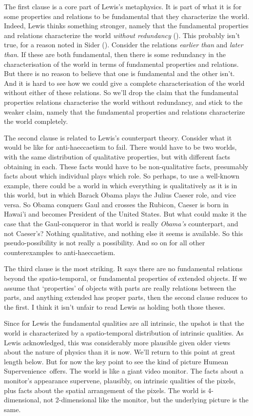 \documentclass[
  11pt,
  letterpaper,
  DIV=11,
  numbers=noendperiod,
  twoside]{scrartcl}
\begin{document}
The first clause is a core part of Lewis's metaphysics. It is part of
what it is for some properties and relations to be fundamental that they
characterize the world. Indeed, Lewis thinks something stronger, namely
that the fundamental properties and relations characterize the world
\emph{without redundancy} ().
This probably isn't true, for a reason noted in Sider
(). Consider the relations \emph{earlier
than} and \emph{later than}. If these are both fundamental, then there
is some redundancy in the characterisation of the world in terms of
fundamental properties and relations. But there is no reason to believe
that one is fundamental and the other isn't. And it is hard to see how
we could give a complete characterisation of the world without either of
these relations. So we'll drop the claim that the fundamental properties
relations characterise the world without redundancy, and stick to the
weaker claim, namely that the fundamental properties and relations
characterize the world completely.

The second clause is related to Lewis's counterpart theory. Consider
what it would be like for anti-haeccaetism to fail. There would have to
be two worlds, with the same distribution of qualitative properties, but
with different facts obtaining in each. These facts would have to be
non-qualitative facts, presumably facts about which individual plays
which role. So perhaps, to use a well-known example, there could be a
world in which everything is qualitatively as it is in this world, but
in which Barack Obama plays the Julius Caeser role, and vice versa. So
Obama conquers Gaul and crosses the Rubicon, Caeser is born in Hawai'i
and becomes President of the United States. But what could make it the
case that the Gaul-conqueror in that world is really \emph{Obama's}
counterpart, and not Caeser's? Nothing qualitative, and nothing else it
seems is available. So this pseudo-possibility is not really a
possibility. And so on for all other counterexamples to
anti-haeccaetism.

The third clause is the most striking. It says there are no fundamental
relations beyond the spatio-temporal, or fundamental properties of
extended objects. If we assume that `properties' of objects with parts
are really relations between the parts, and anything extended has proper
parts, then the second clause reduces to the first. I think it isn't
unfair to read Lewis as holding both those theses.

Since for Lewis the fundamental qualities are all intrinsic, the upshot
is that the world is characterized by a spatio-temporal distribution of
intrinsic qualities. As Lewis acknowledged, this was considerably more
plausible given older views about the nature of physics than it is now.
We'll return to this point at great length below. But for now the key
point to see the kind of picture Humean Supervenience~offers. The world
is like a giant video monitor. The facts about a monitor's appearance
supervene, plausibly, on intrinsic qualities of the pixels, plus facts
about the spatial arrangement of the pixels. The world is 4-dimensional,
not 2-dimensional like the monitor, but the underlying picture is the
same.
\end{document}
